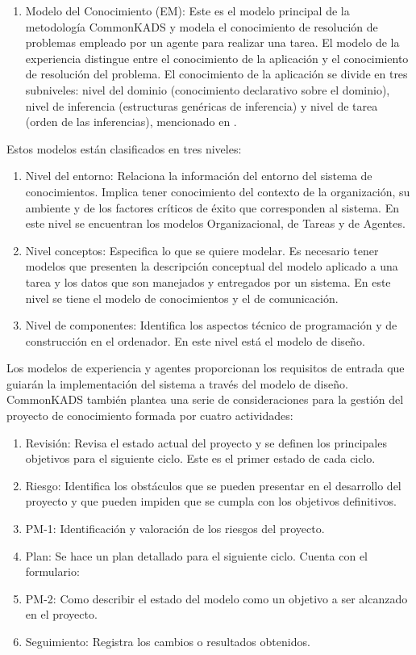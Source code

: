 \begin{enumerate}
\item Modelo del Conocimiento (EM): Este es el modelo principal de la metodología CommonKADS y modela el conocimiento de resolución de problemas empleado por un agente para realizar una tarea. El modelo de la experiencia distingue entre el conocimiento de la aplicación y el conocimiento de resolución del problema. El conocimiento de la aplicación se divide en tres subniveles: nivel del dominio (conocimiento declarativo sobre el dominio), nivel de inferencia (estructuras genéricas de inferencia) y nivel de tarea (orden de las inferencias), mencionado en \citealt[pg. 43]{Henao}.
\end{enumerate}

Estos modelos están clasificados en tres niveles:

\begin{enumerate}
\item Nivel del entorno: Relaciona la información del entorno del sistema de conocimientos. Implica tener conocimiento del contexto de la organización, su ambiente y de los factores críticos de éxito que corresponden al sistema. En este nivel se encuentran los modelos Organizacional, de Tareas y de Agentes.
\item Nivel conceptos: Especifica lo que se quiere modelar. Es necesario tener modelos que presenten la descripción conceptual del modelo aplicado a una tarea y los datos que son manejados y entregados por un sistema. En este nivel se tiene el modelo de conocimientos y el de comunicación.
\item Nivel de componentes: Identifica los aspectos técnico de programación y de construcción en el ordenador. En este nivel está el modelo de diseño.
\end{enumerate}

Los modelos de experiencia y agentes proporcionan los requisitos de entrada que guiarán la implementación del sistema a través del modelo de diseño.
CommonKADS también plantea una serie de consideraciones para la gestión del proyecto de conocimiento formada por cuatro actividades:
\begin{enumerate}
\item Revisión: Revisa el estado actual del proyecto y se definen los principales objetivos para el siguiente ciclo. Este es el primer estado de cada ciclo.
\item Riesgo: Identifica los obstáculos que se pueden presentar en el desarrollo del proyecto y que pueden impiden que se cumpla con los objetivos definitivos.
\item PM-1: Identificación y valoración de los riesgos del proyecto.
\item Plan: Se hace un plan detallado para el siguiente ciclo. Cuenta con el formulario:
\item PM-2: Como describir el estado del modelo como un objetivo a ser alcanzado en el proyecto.
\item Seguimiento: Registra los cambios o resultados obtenidos.
\end{enumerate}

